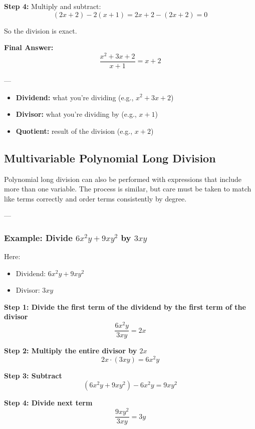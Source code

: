 \documentclass[11pt]{article}
\begin{document}
\textbf{Step 4:} Multiply and subtract:
\[
(2x + 2) - 2(x + 1) = 2x + 2 - (2x + 2) = 0
\]

So the division is exact.

\textbf{Final Answer:}
\[
\frac{x^2 + 3x + 2}{x + 1} = x + 2
\]

---

\begin{tcolorbox}[title=Terminology Review, colback=blue!5!white, colframe=blue!75!black]
\begin{itemize}
  \item \textbf{Dividend:} what you're dividing \quad (e.g., \( x^2 + 3x + 2 \))
  \item \textbf{Divisor:} what you're dividing by \quad (e.g., \( x + 1 \))
  \item \textbf{Quotient:} result of the division \quad (e.g., \( x + 2 \))
\end{itemize}
\end{tcolorbox}
\subsection{Multivariable Polynomial Long Division}

Polynomial long division can also be performed with expressions that include more than one variable. The process is similar, but care must be taken to match like terms correctly and order terms consistently by degree.

---

\subsubsection*{Example: Divide \( 6x^2y + 9xy^2 \) by \( 3xy \)}

Here:
\begin{itemize}
  \item Dividend: \( 6x^2y + 9xy^2 \)
  \item Divisor: \( 3xy \)
\end{itemize}

\textbf{Step 1: Divide the first term of the dividend by the first term of the divisor}
\[
\frac{6x^2y}{3xy} = 2x
\]

\textbf{Step 2: Multiply the entire divisor by \( 2x \)}
\[
2x \cdot (3xy) = 6x^2y
\]

\textbf{Step 3: Subtract}
\[
(6x^2y + 9xy^2) - 6x^2y = 9xy^2
\]

\textbf{Step 4: Divide next term}
\[
\frac{9xy^2}{3xy} = 3y
\]
\end{document}
